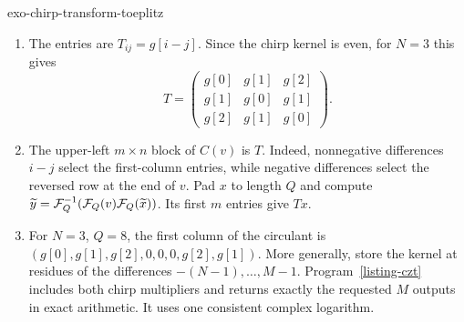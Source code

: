\begin{correction}{exo-chirp-transform-toeplitz}
\begin{enumerate}
\item The entries are $T_{ij}=g[i-j]$. Since the chirp kernel is even,
for $N=3$ this gives
\[
 T=\begin{pmatrix}g[0]&g[1]&g[2]\\g[1]&g[0]&g[1]\\g[2]&g[1]&g[0]\end{pmatrix}.
\]
\item The upper-left $m\times n$ block of $C(v)$ is $T$. Indeed,
nonnegative differences $i-j$ select the first-column entries, while
negative differences select the reversed row at the end of $v$.
Pad $x$ to length $Q$ and compute
$\widetilde y=\mathcal{F}_Q^{-1}(\mathcal{F}_Q(v)\mathcal{F}_Q(\widetilde x))$.
Its first $m$ entries give $Tx$.
\item For $N=3$, $Q=8$, the first column of the circulant is
$(g[0],g[1],g[2],0,0,0,g[2],g[1])$.
More generally, store the kernel at residues of the differences
$-(N-1),\ldots,M-1$. Program~\ref{listing-czt} includes both chirp
multipliers and returns exactly the requested $M$ outputs in exact
arithmetic. It uses one consistent complex logarithm.
\begin{listing}[H]
\caption{A chirp transform with arbitrary input and output lengths.}
\label{listing-czt}
\end{listing}
\end{enumerate}
\end{correction}

